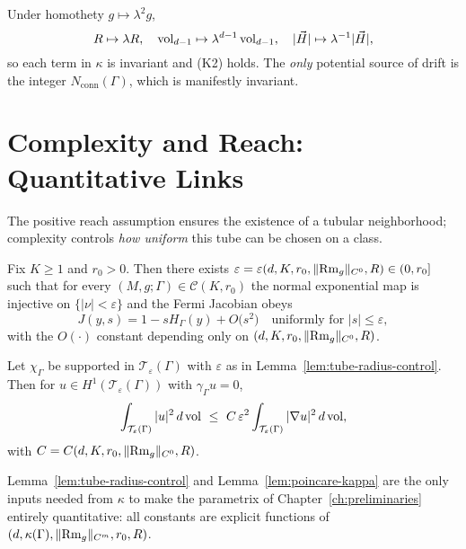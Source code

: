 Under homothety $g\mapsto \lambda^2 g$,
\[
R\mapsto \lambda R,\quad
\operatorname{vol}_{d-1}\mapsto \lambda^{d-1}\operatorname{vol}_{d-1},\quad
|\vec H|\mapsto \lambda^{-1}|\vec H|,
\]
so each term in $\kappa$ is invariant and (K2) holds. The \emph{only} potential source of drift is the integer $N_{\mathrm{conn}}(\Gamma)$, which is manifestly invariant.

\bigskip

\section{Complexity and Reach: Quantitative Links}
\label{sec:reach-links}

The positive reach assumption ensures the existence of a tubular neighborhood; complexity controls \emph{how uniform} this tube can be chosen on a class.

\begin{lemma}
\label{lem:tube-radius-control}
Fix $K\ge 1$ and $r_0>0$. Then there exists $\varepsilon=\varepsilon(d,K,r_0,\|{\rm Rm}_g\|_{C^0},R)\in(0,r_0]$ such that for every $(M,g;\Gamma)\in\mathcal{C}(K,r_0)$ the normal exponential map is injective on $\{|\nu|<\varepsilon\}$ and the Fermi Jacobian obeys
\[
J(y,s)=1-sH_\Gamma(y)+O\big( s^2\big)\quad\text{uniformly for } |s|\le \varepsilon,
\]
with the $O(\cdot)$ constant depending only on $(d,K,r_0,\|{\rm Rm}_g\|_{C^0},R)$.
\end{lemma}

\begin{lemma}
\label{lem:poincare-kappa}
Let $\chi_\Gamma$ be supported in $\mathcal{T}_\varepsilon(\Gamma)$ with $\varepsilon$ as in Lemma~\ref{lem:tube-radius-control}. Then for $u\in H^1(\mathcal{T}_\varepsilon(\Gamma))$ with $\gamma_\Gamma u=0$,
\[
\int_{\mathcal{T}_\varepsilon(\Gamma)} |u|^2\,d\operatorname{vol}
\ \le\ C\,\varepsilon^2\int_{\mathcal{T}_\varepsilon(\Gamma)} |\nabla u|^2\,d\operatorname{vol},
\]
with $C=C(d,K,r_0,\|{\rm Rm}_g\|_{C^0},R)$.
\end{lemma}

\begin{remark}
Lemma~\ref{lem:tube-radius-control} and Lemma~\ref{lem:poincare-kappa} are the only inputs needed from $\kappa$ to make the parametrix of Chapter~\ref{ch:preliminaries} entirely quantitative: all constants are explicit functions of $(d,\kappa(\Gamma),\|{\rm Rm}_g\|_{C^m},r_0,R)$.
\end{remark}

